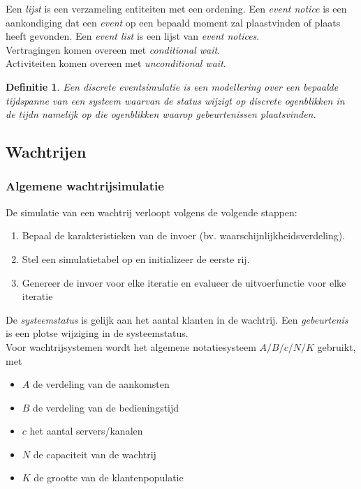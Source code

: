 \documentclass{article}
\newtheorem{mydef}{Definitie}
\begin{document}
	Een \textit{lijst} is een verzameling entiteiten met een ordening. Een \textit{event notice} is een aankondiging dat een \textit{event} op een bepaald moment zal plaastvinden of plaats heeft gevonden. Een \textit{event list} is een lijst van \textit{event notices}.\\

	Vertragingen komen overeen met \textit{conditional wait}.\\
	Activiteiten komen overeen met \textit{unconditional wait}.
	
	\begin{mydef}
		Een discrete eventsimulatie is een modellering over een bepaalde tijdspanne van een systeem waarvan de status wijzigt op discrete ogenblikken in de tijdn namelijk op die ogenblikken waarop gebeurtenissen plaatsvinden.
	\end{mydef}
	
	\subsection{Wachtrijen}
	
	\subsubsection{Algemene wachtrijsimulatie}
	
	De simulatie van een wachtrij verloopt volgens de volgende stappen:
	
	\begin{enumerate}
		\item Bepaal de karakteristieken van de invoer (bv. waarschijnlijkheidsverdeling).
		\item Stel een simulatietabel op en initializeer de eerste rij.
		\item Genereer de invoer voor elke iteratie en evalueer de uitvoerfunctie voor elke iteratie
	\end{enumerate}

	De \textit{systeemstatus} is gelijk aan het aantal klanten in de wachtrij. Een \textit{gebeurtenis} is een plotse wijziging in de systeemstatus. \\
	
	Voor wachtrijsystemen wordt het algemene notatiesysteem $A/B/c/N/K$ gebruikt, met
	\begin{itemize}
		\item $A$ de verdeling van de aankomsten
		\item $B$ de verdeling van de bedieningstijd
		\item $c$ het aantal servers/kanalen
		\item $N$ de capaciteit van de wachtrij
		\item $K$ de grootte van de klantenpopulatie
	\end{itemize}
\end{document}
